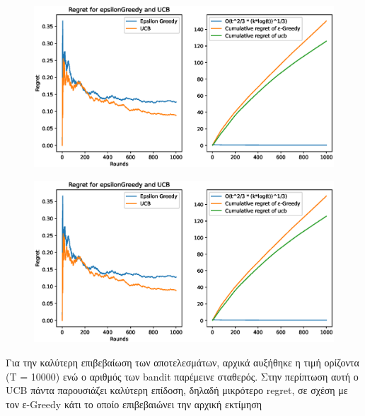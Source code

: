 \clearpage
\begin{figure}[h]
	\centering
	\begin{minipage}{.5\textwidth}
	  \centering
	  \includegraphics[width=1.1\linewidth]{Images/Regret10_1000.eps}
	  \label{fig:UCB_1000}
	\end{minipage}%
	\begin{minipage}{.5\textwidth}
		\centering
		\includegraphics[width=1.1\linewidth]{Images/Regret10_1000.eps}
		\label{fig:epsilon_1000}
	\end{minipage}
\end{figure}

\noindent
Για την καλύτερη επιβεβαίωση των αποτελεσμάτων, αρχικά αυξήθηκε η τιμή ορίζοντα (Τ = 10000) ενώ ο αριθμός των bandit παρέμεινε σταθερός. Στην περίπτωση αυτή ο UCB πάντα παρουσιάζει καλύτερη επίδοση, δηλαδή μικρότερο regret, σε σχέση με τον ε-Greedy κάτι το οποίο επιβεβαιώνει την αρχική εκτίμηση 

